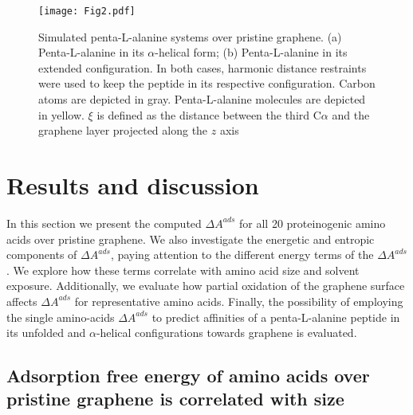 \documentclass[journal=jcisd8,manuscript=article,layout=twocolumn]{achemso}
\begin{document}
\begin{figure}[htbp]
\centerline{\texttt{[image: Fig2.pdf]}}
\caption[]{\label{fig:system-peptide} Simulated penta-L-alanine systems over pristine graphene. (a) Penta-L-alanine  in its $\alpha$-helical form; (b) Penta-L-alanine in its extended configuration. In both cases, harmonic distance restraints were used to keep the peptide in its respective configuration. Carbon atoms are depicted in gray. Penta-L-alanine molecules are depicted in yellow. $\xi$ is defined as the distance between the third C$\alpha$ and the graphene layer projected along the $z$ axis}
\end{figure}

\section{Results and discussion}

In this section we present the computed $\Delta A^{ads}$ for all 20 proteinogenic amino acids over pristine graphene.
We also investigate the energetic and entropic components of $\Delta A^{ads}$, paying attention to the different energy terms of the  $\Delta A^{ads}$.
We explore how these terms correlate with amino acid size and solvent exposure.
Additionally, we evaluate how partial oxidation of the graphene surface affects $\Delta A^{ads}$ for representative amino acids.
Finally, the possibility of employing the single amino-acids $\Delta A^{ads}$ to predict affinities of a penta-L-alanine peptide in its unfolded and $\alpha$-helical configurations towards graphene is evaluated.

\subsection{Adsorption free energy of amino acids over pristine graphene is correlated with size}
\end{document}
